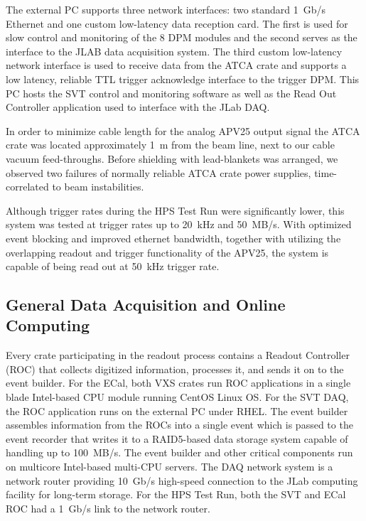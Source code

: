 \documentclass[final,3p,times,twocolumn]{elsarticle}
\begin{document}
The external PC supports three network interfaces: two standard 1~Gb/s Ethernet and one custom 
low-latency data reception card. The first is used for slow control and monitoring of the 8 
DPM modules and the second serves as the interface to the JLAB data acquisition system. The third 
custom low-latency network interface is used to receive data from the ATCA crate and supports a low 
latency, reliable TTL trigger acknowledge interface to the trigger DPM. This PC hosts the SVT control 
and monitoring software as well as the Read Out Controller application used to interface with the 
JLab DAQ.

In order to minimize cable length for the analog APV25 output signal the ATCA crate was located 
approximately 1~m from the beam line, next to our cable vacuum feed-throughs.   
Before shielding with lead-blankets was arranged, we observed two failures of normally reliable ATCA 
crate power supplies, time-correlated to beam instabilities. 

Although trigger rates during the HPS Test Run were significantly lower, this system was tested at 
trigger rates up to 20~kHz and 50~MB/s.  With optimized event blocking and improved ethernet 
bandwidth, together with utilizing the overlapping readout and trigger functionality of the APV25, the 
system is capable of being read out at 50~kHz trigger rate.


\subsection{General Data Acquisition and Online Computing}
\label{sec:daq}
Every crate participating in the readout process contains a Readout Controller (ROC) that 
collects digitized information, processes it, and sends it on to the event builder. For the ECal, both 
VXS crates run ROC applications in a single blade Intel-based CPU module running CentOS 
Linux OS. For the SVT DAQ, the ROC application runs on the external PC under RHEL. 
The event builder assembles information from the ROCs into a single event which is passed to the 
event recorder that writes it to a RAID5-based data storage system capable of handling up to 
100~MB/s. The event builder and other critical components run on multicore Intel-based multi-CPU 
servers. The DAQ network system is a network router providing 10~Gb/s high-speed connection 
to the JLab computing facility for long-term storage. For the HPS Test Run, both the SVT and ECal ROC had 
a 1~Gb/s link to the network router.
\end{document}
